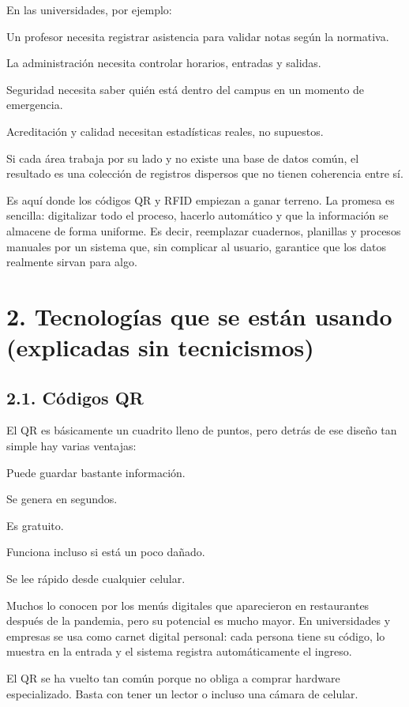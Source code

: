 \documentclass{article}
\begin{document}
En las universidades, por ejemplo:

Un profesor necesita registrar asistencia para validar notas según la normativa.

La administración necesita controlar horarios, entradas y salidas.

Seguridad necesita saber quién está dentro del campus en un momento de emergencia.

Acreditación y calidad necesitan estadísticas reales, no supuestos.

Si cada área trabaja por su lado y no existe una base de datos común, el resultado es una colección de registros dispersos que no tienen coherencia entre sí.

Es aquí donde los códigos QR y RFID empiezan a ganar terreno. La promesa es sencilla: digitalizar todo el proceso, hacerlo automático y que la información se almacene de forma uniforme. Es decir, reemplazar cuadernos, planillas y procesos manuales por un sistema que, sin complicar al usuario, garantice que los datos realmente sirvan para algo.

\section{2. Tecnologías que se están usando (explicadas sin tecnicismos)}

\subsection{2.1. Códigos QR}

El QR es básicamente un cuadrito lleno de puntos, pero detrás de ese diseño tan simple hay varias ventajas:

Puede guardar bastante información.

Se genera en segundos.

Es gratuito.

Funciona incluso si está un poco dañado.

Se lee rápido desde cualquier celular.

Muchos lo conocen por los menús digitales que aparecieron en restaurantes después de la pandemia, pero su potencial es mucho mayor. En universidades y empresas se usa como carnet digital personal: cada persona tiene su código, lo muestra en la entrada y el sistema registra automáticamente el ingreso.

El QR se ha vuelto tan común porque no obliga a comprar hardware especializado. Basta con tener un lector o incluso una cámara de celular.
\end{document}

